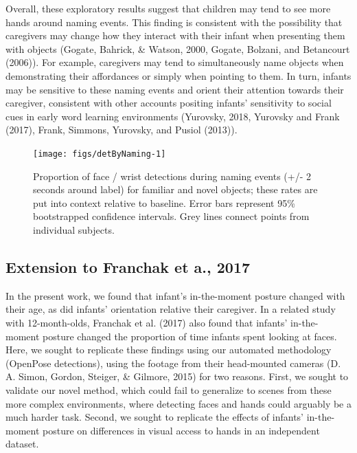 \documentclass[english,man]{apa6}
\begin{document}
Overall, these exploratory results suggest that children may tend to see
more hands around naming events. This finding is consistent with the
possibility that caregivers may change how they interact with their
infant when presenting them with objects (Gogate, Bahrick, \& Watson,
2000, Gogate, Bolzani, and Betancourt (2006)). For example, caregivers
may tend to simultaneously name objects when demonstrating their
affordances or simply when pointing to them. In turn, infants may be
sensitive to these naming events and orient their attention towards
their caregiver, consistent with other accounts positing infants'
sensitivity to social cues in early word learning environments
(Yurovsky, 2018, Yurovsky and Frank (2017), Frank, Simmons, Yurovsky,
and Pusiol (2013)).

\begin{figure}[H]

{\centering \texttt{[image: figs/detByNaming-1]} 

}

\caption{Proportion of face / wrist detections during naming events (+/- 2 seconds around label) for familiar and novel objects; these rates are put into context relative to baseline. Error bars represent 95\% bootstrapped confidence intervals. Grey lines connect points from individual subjects.}\label{fig:detByNaming}
\end{figure}

\subsection{Extension to Franchak et a.,
2017}\label{extension-to-franchak-et-a.-2017}

In the present work, we found that infant's in-the-moment posture
changed with their age, as did infants' orientation relative their
caregiver. In a related study with 12-month-olds, Franchak et al. (2017)
also found that infants' in-the-moment posture changed the proportion of
time infants spent looking at faces. Here, we sought to replicate these
findings using our automated methodology (OpenPose detections), using
the footage from their head-mounted cameras (D. A. Simon, Gordon,
Steiger, \& Gilmore, 2015) for two reasons. First, we sought to validate
our novel method, which could fail to generalize to scenes from these
more complex environments, where detecting faces and hands could
arguably be a much harder task. Second, we sought to replicate the
effects of infants' in-the-moment posture on differences in visual
access to hands in an independent dataset.
\end{document}
